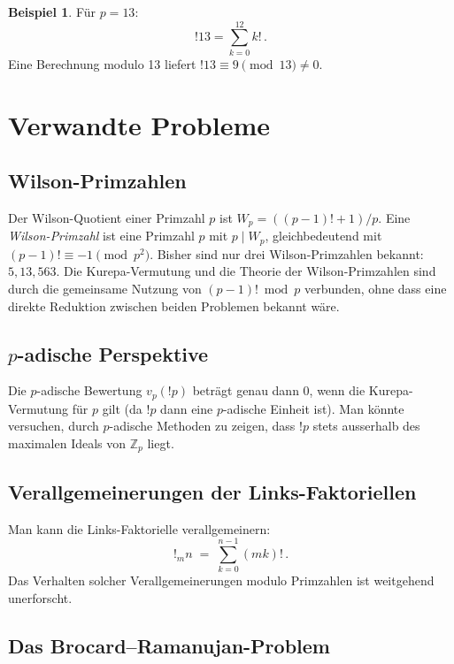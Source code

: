 \documentclass[12pt,a4paper]{amsart}
\theoremstyle{definition}
\newtheorem{beispiel}[theorem]{Beispiel}
\newcommand{\Z}{\mathbb{Z}}
\begin{document}
\begin{beispiel}
Für $p = 13$:
\[
  !13 = \sum_{k=0}^{12} k!\,.
\]
Eine Berechnung modulo 13 liefert $!13 \equiv 9 \pmod{13} \neq 0$.
\end{beispiel}

\section{Verwandte Probleme}
\label{sec:verwandt}

\subsection{Wilson-Primzahlen}

Der Wilson-Quotient einer Primzahl $p$ ist $W_p = ((p-1)! + 1)/p$.
Eine \emph{Wilson-Primzahl} ist eine Primzahl $p$ mit $p \mid W_p$,
gleichbedeutend mit $(p-1)! \equiv -1 \pmod{p^2}$.
Bisher sind nur drei Wilson-Primzahlen bekannt: $5, 13, 563$.
Die Kurepa-Vermutung und die Theorie der Wilson-Primzahlen sind durch die
gemeinsame Nutzung von $(p-1)! \bmod p$ verbunden, ohne dass eine direkte
Reduktion zwischen beiden Problemen bekannt wäre.

\subsection{$p$-adische Perspektive}

Die $p$-adische Bewertung $v_p(!p)$ beträgt genau dann $0$,
wenn die Kurepa-Vermutung für $p$ gilt (da $!p$ dann eine $p$-adische Einheit
ist).
Man könnte versuchen, durch $p$-adische Methoden zu zeigen, dass $!p$ stets
ausserhalb des maximalen Ideals von $\Z_p$ liegt.

\subsection{Verallgemeinerungen der Links-Faktoriellen}

Man kann die Links-Faktori\-elle verallgemeinern:
\[
  !_m n \;=\; \sum_{k=0}^{n-1} (mk)!\,.
\]
Das Verhalten solcher Verallgemeinerungen modulo Primzahlen ist weitgehend
unerforscht.

\subsection{Das Brocard--Ramanujan-Problem}
\end{document}
